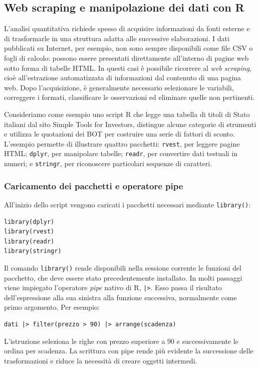 \subsection{Web scraping e manipolazione dei dati con R}
\label{sec:web_scraping_dplyr}

L'analisi quantitativa richiede spesso di acquisire informazioni da fonti esterne e di trasformarle in una struttura adatta alle successive elaborazioni. I dati pubblicati su Internet, per esempio, non sono sempre disponibili come file CSV o fogli di calcolo: possono essere presentati direttamente all'interno di pagine web sotto forma di tabelle HTML. In questi casi è possibile ricorrere al \emph{web scraping}, cioè all'estrazione automatizzata di informazioni dal contenuto di una pagina web. Dopo l'acquisizione, è generalmente necessario selezionare le variabili, correggere i formati, classificare le osservazioni ed eliminare quelle non pertinenti.

Consideriamo come esempio uno script R che legge una tabella di titoli di Stato italiani dal sito Simple Tools for Investors, distingue alcune categorie di strumenti e utilizza le quotazioni dei BOT per costruire una serie di fattori di sconto. L'esempio permette di illustrare quattro pacchetti: \texttt{rvest}, per leggere pagine HTML; \texttt{dplyr}, per manipolare tabelle; \texttt{readr}, per convertire dati testuali in numeri; e \texttt{stringr}, per riconoscere particolari sequenze di caratteri.

\subsubsection{Caricamento dei pacchetti e operatore pipe}

All'inizio dello script vengono caricati i pacchetti necessari mediante \texttt{library()}:
\begin{verbatim}
library(dplyr)
library(rvest)
library(readr)
library(stringr)
\end{verbatim}
Il comando \texttt{library()} rende disponibili nella sessione corrente le funzioni del pacchetto, che deve essere stato precedentemente installato. In molti passaggi viene impiegato l'operatore \emph{pipe} nativo di R, \texttt{|>}. Esso passa il risultato dell'espressione alla sua sinistra alla funzione successiva, normalmente come primo argomento. Per esempio:
\begin{verbatim}
dati |> filter(prezzo > 90) |> arrange(scadenza)
\end{verbatim}
L'istruzione seleziona le righe con prezzo superiore a 90 e successivamente le ordina per scadenza. La scrittura con pipe rende più evidente la successione delle trasformazioni e riduce la necessità di creare oggetti intermedi.

